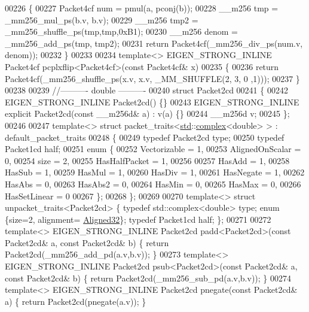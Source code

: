 \begin{DoxyCode}
00226 \{
00227   Packet4cf num = pmul(a, pconj(b));
00228   \_\_m256 tmp = \_mm256\_mul\_ps(b.v, b.v);
00229   \_\_m256 tmp2    = \_mm256\_shuffle\_ps(tmp,tmp,0xB1);
00230   \_\_m256 denom = \_mm256\_add\_ps(tmp, tmp2);
00231   \textcolor{keywordflow}{return} Packet4cf(\_mm256\_div\_ps(num.v, denom));
00232 \}
00233 
00234 \textcolor{keyword}{template}<> EIGEN\_STRONG\_INLINE Packet4cf pcplxflip<Packet4cf>(\textcolor{keyword}{const} Packet4cf& x)
00235 \{
00236   \textcolor{keywordflow}{return} Packet4cf(\_mm256\_shuffle\_ps(x.v, x.v, \_MM\_SHUFFLE(2, 3, 0 ,1)));
00237 \}
00238 
00239 \textcolor{comment}{//---------- double ----------}
00240 \textcolor{keyword}{struct }Packet2cd
00241 \{
00242   EIGEN\_STRONG\_INLINE Packet2cd() \{\}
00243   EIGEN\_STRONG\_INLINE \textcolor{keyword}{explicit} Packet2cd(\textcolor{keyword}{const} \_\_m256d& a) : v(a) \{\}
00244   \_\_m256d  v;
00245 \};
00246 
00247 \textcolor{keyword}{template}<> \textcolor{keyword}{struct }packet\_traits<\hyperlink{namespacestd}{std}::\hyperlink{structcomplex}{complex}<double> >  : default\_packet\_traits
00248 \{
00249   \textcolor{keyword}{typedef} Packet2cd type;
00250   \textcolor{keyword}{typedef} Packet1cd half;
00251   \textcolor{keyword}{enum} \{
00252     Vectorizable = 1,
00253     AlignedOnScalar = 0,
00254     size = 2,
00255     HasHalfPacket = 1,
00256 
00257     HasAdd    = 1,
00258     HasSub    = 1,
00259     HasMul    = 1,
00260     HasDiv    = 1,
00261     HasNegate = 1,
00262     HasAbs    = 0,
00263     HasAbs2   = 0,
00264     HasMin    = 0,
00265     HasMax    = 0,
00266     HasSetLinear = 0
00267   \};
00268 \};
00269 
00270 \textcolor{keyword}{template}<> \textcolor{keyword}{struct }unpacket\_traits<Packet2cd> \{ \textcolor{keyword}{typedef} std::complex<double> type; \textcolor{keyword}{enum} \{size=2, alignment=
      \hyperlink{group__enums_gga45fe06e29902b7a2773de05ba27b47a1a7797d247b86f6e9837cc338beb6060de}{Aligned32}\}; \textcolor{keyword}{typedef} Packet1cd half; \};
00271 
00272 \textcolor{keyword}{template}<> EIGEN\_STRONG\_INLINE Packet2cd padd<Packet2cd>(\textcolor{keyword}{const} Packet2cd& a, \textcolor{keyword}{const} Packet2cd& b) \{ \textcolor{keywordflow}{return} 
      Packet2cd(\_mm256\_add\_pd(a.v,b.v)); \}
00273 \textcolor{keyword}{template}<> EIGEN\_STRONG\_INLINE Packet2cd psub<Packet2cd>(\textcolor{keyword}{const} Packet2cd& a, \textcolor{keyword}{const} Packet2cd& b) \{ \textcolor{keywordflow}{return} 
      Packet2cd(\_mm256\_sub\_pd(a.v,b.v)); \}
00274 \textcolor{keyword}{template}<> EIGEN\_STRONG\_INLINE Packet2cd pnegate(\textcolor{keyword}{const} Packet2cd& a) \{ \textcolor{keywordflow}{return} Packet2cd(pnegate(a.v)); \}

\end{DoxyCode}
